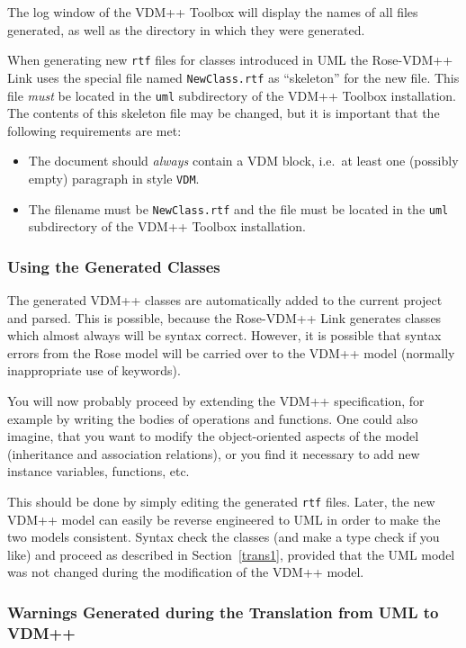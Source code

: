 \documentclass[\pformat,12pt]{article}
\newcommand{\vdmpp}{VDM++}
\newcommand{\ToolboxName}{\vdmpp{} Toolbox}
\newcommand{\link}{Rose-\vdmpp{} Link}
\begin{document}
The log window of the \vdmpp{} Toolbox will display the names of all
files generated, as well as the directory in which they were generated.

When generating new {\tt rtf} files for classes introduced in UML the
\link{} uses the special file named {\tt NewClass.rtf} as ``skeleton''
for the new file. This file {\em must} be located in the {\tt uml}
subdirectory of the \ToolboxName{} installation. The contents of this
skeleton file may be changed, but it is important that the following
requirements are met:
\begin{itemize}
\item The document should {\em always} contain a VDM block, i.e.\ at
  least one (possibly empty) paragraph in style {\tt VDM}.
\item The filename must be {\tt NewClass.rtf} and the file must be
  located in the {\tt uml} subdirectory of the \ToolboxName{} installation.
\end{itemize}


\subsubsection*{Using the Generated Classes}

The generated \vdmpp{} classes are automatically added to the current
project and parsed. This is possible, because the \link{} generates
classes which almost always will be syntax correct. However, it is
possible that syntax errors from the Rose model will be carried over
to the VDM++ model (normally inappropriate use of keywords).

You will now probably proceed by extending the \vdmpp{} specification,
for example by writing the bodies of operations and functions.  One
could also imagine, that you want to modify the object-oriented
aspects of the model (inheritance and association relations), or you
find it necessary to add new instance variables, functions, etc.

This should be done by simply editing the generated {\tt rtf} files.
Later, the new \vdmpp{} model can easily be reverse engineered to UML in order
to make the two models consistent. Syntax check the classes (and make
a type check if you like) and proceed as described in
Section~\ref{trans1}, provided that the UML model was not changed
during the modification of the \vdmpp{} model.

\subsubsection*{Warnings Generated during the Translation from UML to \vdmpp{}}
\end{document}
